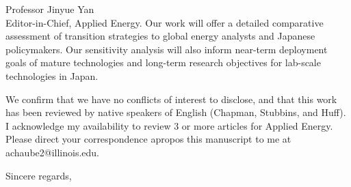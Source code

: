 \documentclass[10pt]{letter} %
\begin{document}
\begin{letter}{Professor Jinyue Yan\\
Editor-in-Chief, Applied Energy.}
Our work will offer a detailed comparative assessment of transition strategies to global energy analysts and Japanese policymakers. Our sensitivity analysis will also inform near-term deployment goals of mature technologies and long-term research objectives for lab-scale technologies in Japan.

We confirm that we have no conflicts of interest to disclose, and that this work has been reviewed by native speakers of English (Chapman, Stubbins, and Huff). I acknowledge my availability to review 3 or more articles for Applied Energy. Please direct your correspondence apropos this manuscript to me at achaube2@illinois.edu. 

\closing{Sincere regards,\\
}


\end{letter}
\end{document}
